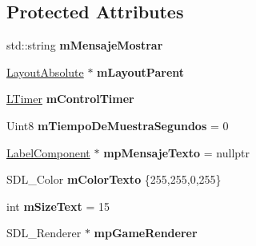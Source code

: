 \subsection*{Protected Attributes}
\begin{DoxyCompactItemize}
\item 
std\+::string {\bfseries m\+Mensaje\+Mostrar}\hypertarget{class_pop_up_mostrar_mensaje_texto_a01ce5ef7e4dcefc51f9ce14c97974df0}{}\label{class_pop_up_mostrar_mensaje_texto_a01ce5ef7e4dcefc51f9ce14c97974df0}

\item 
\hyperlink{class_layout_absolute}{Layout\+Absolute} $\ast$ {\bfseries m\+Layout\+Parent}\hypertarget{class_pop_up_mostrar_mensaje_texto_a0d68b5c744c3e7e9ab0d29c634bbf4df}{}\label{class_pop_up_mostrar_mensaje_texto_a0d68b5c744c3e7e9ab0d29c634bbf4df}

\item 
\hyperlink{class_l_timer}{L\+Timer} {\bfseries m\+Control\+Timer}\hypertarget{class_pop_up_mostrar_mensaje_texto_acddb5761cdfa7a400a75f4084d8f50f4}{}\label{class_pop_up_mostrar_mensaje_texto_acddb5761cdfa7a400a75f4084d8f50f4}

\item 
Uint8 {\bfseries m\+Tiempo\+De\+Muestra\+Segundos} = 0\hypertarget{class_pop_up_mostrar_mensaje_texto_a13da16dc97c3a26e456dec9d8c8198ef}{}\label{class_pop_up_mostrar_mensaje_texto_a13da16dc97c3a26e456dec9d8c8198ef}

\item 
\hyperlink{class_label_component}{Label\+Component} $\ast$ {\bfseries mp\+Mensaje\+Texto} = nullptr\hypertarget{class_pop_up_mostrar_mensaje_texto_a86d8c685993c912cb218440704bec217}{}\label{class_pop_up_mostrar_mensaje_texto_a86d8c685993c912cb218440704bec217}

\item 
S\+D\+L\+\_\+\+Color {\bfseries m\+Color\+Texto} \{255,255,0,255\}\hypertarget{class_pop_up_mostrar_mensaje_texto_a2919b17b16bc3156a114f5c21a03a995}{}\label{class_pop_up_mostrar_mensaje_texto_a2919b17b16bc3156a114f5c21a03a995}

\item 
int {\bfseries m\+Size\+Text} = 15\hypertarget{class_pop_up_mostrar_mensaje_texto_a9c2fa9e21d94f4e7bda423da70316fda}{}\label{class_pop_up_mostrar_mensaje_texto_a9c2fa9e21d94f4e7bda423da70316fda}

\item 
S\+D\+L\+\_\+\+Renderer $\ast$ {\bfseries mp\+Game\+Renderer}\hypertarget{class_pop_up_mostrar_mensaje_texto_ab39eaa187f3534cdb039861f455dc920}{}\label{class_pop_up_mostrar_mensaje_texto_ab39eaa187f3534cdb039861f455dc920}

\end{DoxyCompactItemize}


